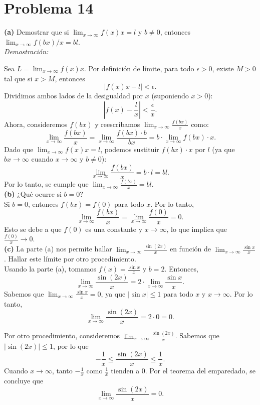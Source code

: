 \section*{Problema 14}
\textbf{(a)} Demostrar que si $\lim_{x \to \infty} f(x)x = l$ y $b \neq 0$, entonces $\lim_{x \to \infty} f(bx)/x = bl$.\\

\textit{Demostración:}

Sea $L = \lim_{x \to \infty} f(x)x$. Por definición de límite, para todo $\epsilon > 0$, existe $M > 0$ tal que si $x > M$, entonces
\[
|f(x)x - l| < \epsilon.
\]
Dividimos ambos lados de la desigualdad por $x$ (suponiendo $x > 0$):
\[
\left|f(x) - \frac{l}{x}\right| < \frac{\epsilon}{x}.
\]
Ahora, consideremos $f(bx)$ y reescribamos $\lim_{x \to \infty} \frac{f(bx)}{x}$ como:
\[
\lim_{x \to \infty} \frac{f(bx)}{x} = \lim_{x \to \infty} \frac{f(bx) \cdot b}{bx} = b \cdot \lim_{x \to \infty} f(bx) \cdot x.
\]
Dado que $\lim_{x \to \infty} f(x)x = l$, podemos sustituir $f(bx) \cdot x$ por $l$ (ya que $bx \to \infty$ cuando $x \to \infty$ y $b \neq 0$):
\[
\lim_{x \to \infty} \frac{f(bx)}{x} = b \cdot l = bl.
\]
Por lo tanto, se cumple que $\lim_{x \to \infty} \frac{f(bx)}{x} = bl$.\\

\textbf{(b)} ¿Qué ocurre si $b = 0$?\\

Si $b = 0$, entonces $f(bx) = f(0)$ para todo $x$. Por lo tanto,
\[
\lim_{x \to \infty} \frac{f(bx)}{x} = \lim_{x \to \infty} \frac{f(0)}{x} = 0.
\]
Esto se debe a que $f(0)$ es una constante y $x \to \infty$, lo que implica que $\frac{f(0)}{x} \to 0$.\\

\textbf{(c)} La parte (a) nos permite hallar $\lim_{x \to \infty} \frac{\sin(2x)}{x}$ en función de $\lim_{x \to \infty} \frac{\sin x}{x}$. Hallar este límite por otro procedimiento.\\

Usando la parte (a), tomamos $f(x) = \frac{\sin x}{x}$ y $b = 2$. Entonces,
\[
\lim_{x \to \infty} \frac{\sin(2x)}{x} = 2 \cdot \lim_{x \to \infty} \frac{\sin x}{x}.
\]
Sabemos que $\lim_{x \to \infty} \frac{\sin x}{x} = 0$, ya que $|\sin x| \leq 1$ para todo $x$ y $x \to \infty$. Por lo tanto,
\[
\lim_{x \to \infty} \frac{\sin(2x)}{x} = 2 \cdot 0 = 0.
\]

Por otro procedimiento, consideremos $\lim_{x \to \infty} \frac{\sin(2x)}{x}$. Sabemos que $|\sin(2x)| \leq 1$, por lo que
\[
-\frac{1}{x} \leq \frac{\sin(2x)}{x} \leq \frac{1}{x}.
\]
Cuando $x \to \infty$, tanto $-\frac{1}{x}$ como $\frac{1}{x}$ tienden a $0$. Por el teorema del emparedado, se concluye que
\[
\lim_{x \to \infty} \frac{\sin(2x)}{x} = 0.
\]
